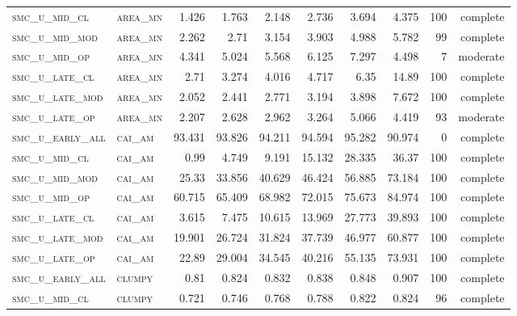 \begin{landscape}
\begin{center}
\begin{footnotesize}
\begin{longtable}{llrrrrr|rrr}
\textsc{smc\_u\_mid\_cl   } & \textsc{area\_mn  }   & 1.426    & 1.763    & 2.148    & 2.736    & 3.694    & 4.375    & 100 & complete \\
\textsc{smc\_u\_mid\_mod  } & \textsc{area\_mn  }   & 2.262    & 2.71     & 3.154    & 3.903    & 4.988    & 5.782    & 99  & complete \\
\textsc{smc\_u\_mid\_op   } & \textsc{area\_mn  }   & 4.341    & 5.024    & 5.568    & 6.125    & 7.297    & 4.498    & 7   & moderate \\
\textsc{smc\_u\_late\_cl  } & \textsc{area\_mn  }   & 2.71     & 3.274    & 4.016    & 4.717    & 6.35     & 14.89    & 100 & complete \\
\textsc{smc\_u\_late\_mod } & \textsc{area\_mn  }   & 2.052    & 2.441    & 2.771    & 3.194    & 3.898    & 7.672    & 100 & complete \\
\textsc{smc\_u\_late\_op  } & \textsc{area\_mn  }   & 2.207    & 2.628    & 2.962    & 3.264    & 5.066    & 4.419    & 93  & moderate \\
\textsc{smc\_u\_early\_all} & \textsc{cai\_am   }   & 93.431   & 93.826   & 94.211   & 94.594   & 95.282   & 90.974   & 0   & complete \\
\textsc{smc\_u\_mid\_cl   } & \textsc{cai\_am   }   & 0.99     & 4.749    & 9.191    & 15.132   & 28.335   & 36.37    & 100 & complete \\
\textsc{smc\_u\_mid\_mod  } & \textsc{cai\_am   }   & 25.33    & 33.856   & 40.629   & 46.424   & 56.885   & 73.184   & 100 & complete \\
\textsc{smc\_u\_mid\_op   } & \textsc{cai\_am   }   & 60.715   & 65.409   & 68.982   & 72.015   & 75.673   & 84.974   & 100 & complete \\
\textsc{smc\_u\_late\_cl  } & \textsc{cai\_am   }   & 3.615    & 7.475    & 10.615   & 13.969   & 27.773   & 39.893   & 100 & complete \\
\textsc{smc\_u\_late\_mod } & \textsc{cai\_am   }   & 19.901   & 26.724   & 31.824   & 37.739   & 46.977   & 60.877   & 100 & complete \\
\textsc{smc\_u\_late\_op  } & \textsc{cai\_am   }   & 22.89    & 29.004   & 34.545   & 40.216   & 55.135   & 73.931   & 100 & complete \\
\textsc{smc\_u\_early\_all} & \textsc{clumpy    }   & 0.81     & 0.824    & 0.832    & 0.838    & 0.848    & 0.907    & 100 & complete \\
\textsc{smc\_u\_mid\_cl   } & \textsc{clumpy    }   & 0.721    & 0.746    & 0.768    & 0.788    & 0.822    & 0.824    & 96  & complete \\

\end{longtable}
\end{footnotesize}
\end{center}
\end{landscape}
